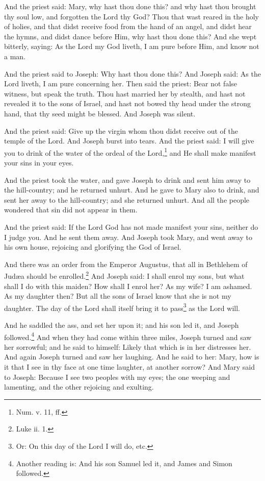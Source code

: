 \pend\pstart
And the priest said: Mary, why hast thou done this? and why hast thou brought thy soul low, and forgotten the Lord thy God? Thou that wast reared in the holy of holies, and that didst receive food from the hand of an angel, and didst hear the hymns, and didst dance before Him, why hast thou done this? And she wept bitterly, saying: As the Lord my God liveth, I am pure before Him, and know not a man.

\pend\pstart
And the priest said to Joseph: Why hast thou done this? And Joseph said: As the Lord liveth, I am pure concerning her. Then said the priest: Bear not false witness, but speak the truth. Thou hast married her by stealth, and hast not revealed it to the sons of Israel, and hast not bowed thy head under the strong hand, that thy seed might be blessed. And Joseph was silent.

\pend\pstart
{}

\pend\pstart
And the priest said: Give up the virgin whom thou didst receive out of the temple of the Lord. And Joseph burst into tears. And the priest said: I will give you to drink of the water of the ordeal of the Lord,\footnote{Num. v. 11, ff.} and He shall make manifest your sins in your eyes.

\pend\pstart
And the priest took the water, and gave Joseph to drink and sent him away to the hill-country; and he returned unhurt. And he gave to Mary also to drink, and sent her away to the hill-country; and she returned unhurt. And all the people wondered that sin did not appear in them.

\pend\pstart
And the priest said: If the Lord God has not made manifest your sins, neither do I judge you. And he sent them away. And Joseph took Mary, and went away to his own house, rejoicing and glorifying the God of Israel.

\pend\pstart
{}

\pend\pstart
And there was an order from the Emperor Augustus, that all in Bethlehem of Judæa should be enrolled.\footnote{Luke ii. 1.} And Joseph said: I shall enrol my sons, but what shall I do with this maiden? How shall I enrol her? As my wife? I am ashamed. As my daughter then? But all the sons of Israel know that she is not my daughter. The day of the Lord shall itself bring it to pass\footnote{Or: On this day of the Lord I will do, etc.} as the Lord will.

\pend\pstart
And he saddled the ass, and set her upon it; and his son led it, and Joseph followed.\footnote{Another reading is: And his son Samuel led it, and James and Simon followed.} And when they had come within three miles, Joseph turned and saw her sorrowful; and he said to himself: Likely that which is in her distresses her. And again Joseph turned and saw her laughing. And he said to her: Mary, how is it that I see in thy face at one time laughter, at another sorrow? And Mary said to Joseph: Because I see two peoples with my eyes; the one weeping and lamenting, and the other rejoicing and exulting.

